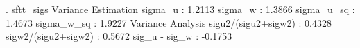 . sftt_sigs
{\smallskip}
               Variance Estimation          
sigma_u    :       1.2113
sigma_w    :       1.3866
sigma_u_sq :       1.4673
sigma_w_sq :       1.9227
               Variance Analysis          
sigu2/(sigu2+sigw2) : 0.4328
sigw2/(sigu2+sigw2) : 0.5672
sig_u - sig_w       : -0.1753
